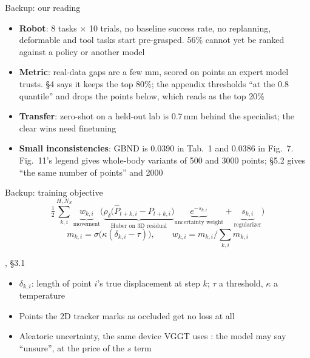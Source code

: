 \documentclass[aspectratio=169,12pt]{beamer}
\newcommand{\src}[1]{{\scriptsize\color{mute}\citep{#1}}}
\newcommand{\credit}[1]{\par\hfill{\tiny\color{mute}\citet{huang2026pointworld}, #1}\par}
\newenvironment{notes}[1][\linewidth]
  {\begin{minipage}{#1}\footnotesize\begin{itemize}\setlength{\itemsep}{2pt}}
  {\end{itemize}\end{minipage}}
\begin{document}
\appendix

\begin{frame}{Backup: our reading}
  \footnotesize
  \begin{itemize}\setlength{\itemsep}{5pt}
    \item \textbf{Robot}: 8 tasks $\times$ 10 trials, no baseline success rate, no
      replanning, deformable and tool tasks start pre-grasped. 56\% cannot yet be ranked
      against a policy or another model
    \item \textbf{Metric}: real-data gaps are a few mm, scored on points an expert model
      trusts. \S4 says it keeps the top 80\%; the appendix thresholds ``at the 0.8
      quantile'' and drops the points below, which reads as the top 20\%
    \item \textbf{Transfer}: zero-shot on a held-out lab is 0.7\,mm behind the specialist;
      the clear wins need finetuning
    \item \textbf{Small inconsistencies}: GBND is 0.0390 in Tab.~1 and 0.0386 in Fig.~7.
      Fig.~11's legend gives whole-body variants of 500 and 3000 points; \S5.2 gives ``the
      same number of points'' and 2000
  \end{itemize}
\end{frame}

\begin{frame}{Backup: training objective}
  \small
  \[
    \tfrac12 \sum_{k,i}^{H, N_S}
    \underbrace{w_{k,i}}_{\text{movement}}
    \Big( \underbrace{\rho_\delta\big(\hat P_{t+k,i} - P_{t+k,i}\big)}_{\text{Huber on 3D residual}}
    \underbrace{e^{-s_{k,i}}}_{\text{uncertainty weight}}
    + \underbrace{s_{k,i}}_{\text{regularizer}} \Big)
    \tag{1}
  \]
  \[
    m_{k,i} = \sigma\big(\kappa(\delta_{k,i} - \tau)\big), \qquad
    w_{k,i} = m_{k,i} \Big/ \textstyle\sum_{k,i} m_{k,i}
  \]
  \credit{\S3.1}
  \vfill
  \begin{notes}
    \item $\delta_{k,i}$: length of point $i$'s true displacement at step $k$; $\tau$ a
      threshold, $\kappa$ a temperature
    \item Points the 2D tracker marks as occluded get no loss at all
    \item Aleatoric uncertainty, the same device VGGT uses \src{wang2025vggt}: the model may
      say ``unsure'', at the price of the $s$ term
  \end{notes}
\end{frame}
\end{document}

